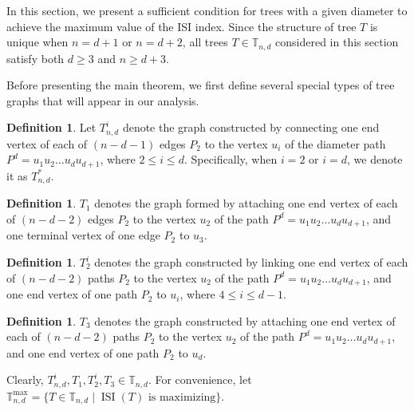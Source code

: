 \documentclass[12pt]{article}
\theoremstyle{definition}
\newtheorem{definition}[theorem]{Definition}
\newcommand{\ISI}{\operatorname{ISI}}
\newcommand{\TT}{\mathbb{T}}
\begin{document}
In this section, we present a sufficient condition for trees with a given diameter to achieve the maximum value of the ISI index. Since the structure of tree \(T\) is unique when \(n = d+1\) or \(n = d+2\), all trees \(T \in \TT_{n,d}\) considered in this section satisfy both \(d \geq 3\) and \(n \geq d+3\).

Before presenting the main theorem, we first define several special types of tree graphs that will appear in our analysis.

\begin{definition}
Let \(T_{n,d}^i\) denote the graph constructed by connecting one end vertex of each of \((n-d-1)\) edges \(P_2\) to the vertex \(u_i\) of the diameter path \(P^d = u_1u_2\ldots u_d u_{d+1}\), where \(2 \leq i \leq d\). Specifically, when \(i = 2\) or \(i = d\), we denote it as \(T_{n,d}^*\).
\end{definition}

\begin{definition}
\(T_1\) denotes the graph formed by attaching one end vertex of each of \((n-d-2)\) edges \(P_2\) to the vertex \(u_2\) of the path \(P^d = u_1u_2\ldots u_d u_{d+1}\), and one terminal vertex of one edge \(P_2\) to \(u_3\).
\end{definition}

\begin{definition}
\(T_2^i\) denotes the graph constructed by linking one end vertex of each of \((n-d-2)\) paths \(P_2\) to the vertex \(u_2\) of the path \(P^d = u_1u_2\ldots u_d u_{d+1}\), and one end vertex of one path \(P_2\) to \(u_i\), where \(4 \leq i \leq d-1\).
\end{definition}

\begin{definition}
\(T_3\) denotes the graph constructed by attaching one end vertex of each of \((n-d-2)\) paths \(P_2\) to the vertex \(u_2\) of the path \(P^d = u_1u_2\ldots u_d u_{d+1}\), and one end vertex of one path \(P_2\) to \(u_d\).
\end{definition}

Clearly, \(T_{n,d}^i, T_1, T_2^i, T_3 \in \TT_{n,d}\). For convenience, let \(\TT_{n,d}^{\max} = \{T \in \TT_{n,d} \mid \ISI(T) \text{ is maximizing}\}\).
\end{document}
